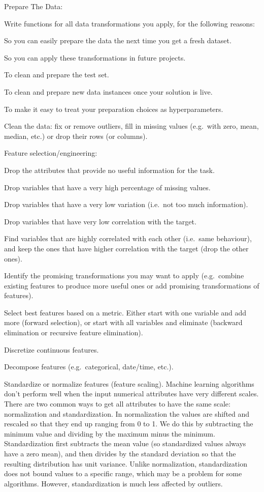 Prepare The Data:
\bit
\item Write functions for all data transformations you apply, for the following reasons:
\item So you can easily prepare the data the next time you get a fresh dataset.
\item So you can apply these transformations in future projects.
\item To clean and prepare the test set.
\item To clean and prepare new data instances once your solution is live.
\item To make it easy to treat your preparation choices as hyperparameters.
\item Clean the data: fix or remove outliers, fill in missing values (e.g.\ with zero, mean, median, etc.) or drop their
rows (or columns).
\item Feature selection/engineering:
\item Drop the attributes that provide no useful information for the task.
\item Drop variables that have a very high percentage of missing values.
\item Drop variables that have a very low variation (i.e.\ not too much information).
\item Drop variables that have very low correlation with the target.
\item Find variables that are highly correlated with each other (i.e.\ same behaviour), and keep the ones that have
higher correlation with the target (drop the other ones).
\item Identify the promising transformations you may want to apply (e.g.\ combine existing features to produce more
useful ones or add promising transformations of features).
\item Select best features based on a metric. Either start with one variable and add more (forward selection), or start
with all variables and eliminate (backward elimination or recursive feature elimination).
\item Discretize continuous features.
\item Decompose features (e.g.\ categorical, date/time, etc.).
\item Standardize or normalize features (feature scaling). Machine learning algorithms don't perform well when the input
numerical attributes have very different scales. There are two common ways to get all attributes to have the same scale:
normalization and standardization. In normalization the values are shifted and rescaled so that they end up ranging from
0 to 1. We do this by subtracting the minimum value and dividing by the maximum minus the minimum. Standardization first
subtracts the mean value (so standardized values always have a zero mean), and then divides by the standard deviation so
that the resulting distribution has unit variance. Unlike normalization, standardization does not bound values to a
specific range, which may be a problem for some algorithms. However, standardization is much less affected by outliers.
\eit

